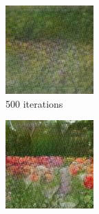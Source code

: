 \documentclass{article}
\begin{document}
\begin{figure}[h!]
\begin{subfigure}[b]{0.24\textwidth}
         \includegraphics[width=\textwidth]{illustration/flower_sngan_500.jpg}
         \caption{500 iterations}
     \end{subfigure}
     \begin{subfigure}[b]{0.24\textwidth}
         \centering
         \includegraphics[width=\textwidth]{illustration/flower_sngan_2000.jpg}

\end{subfigure}
\end{figure}
\end{document}

